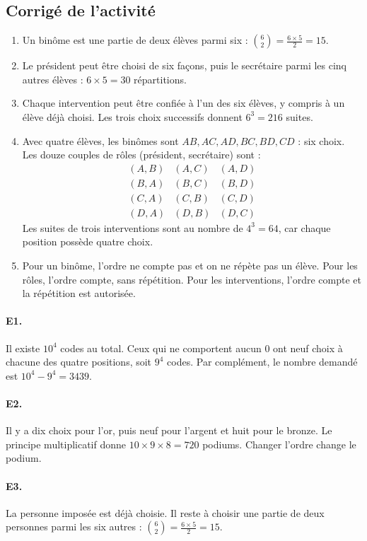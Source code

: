\subsection{Corrigé de l'activité}\begin{enumerate}
\item Un binôme est une partie de deux élèves parmi six : $\binom{6}{2}=\frac{6\times5}{2}=15$.
\item Le président peut être choisi de six façons, puis le secrétaire parmi les cinq autres élèves : $6\times5=30$ répartitions.
\item Chaque intervention peut être confiée à l'un des six élèves, y compris à un élève déjà choisi. Les trois choix successifs donnent $6^3=216$ suites.
\item Avec quatre élèves, les binômes sont $AB,AC,AD,BC,BD,CD$ : six choix. Les douze couples de rôles (président, secrétaire) sont :\[\begin{array}{lll}(A,B)&(A,C)&(A,D)\\(B,A)&(B,C)&(B,D)\\(C,A)&(C,B)&(C,D)\\(D,A)&(D,B)&(D,C)\end{array}\] Les suites de trois interventions sont au nombre de $4^3=64$, car chaque position possède quatre choix.
\item Pour un binôme, l'ordre ne compte pas et on ne répète pas un élève. Pour les rôles, l'ordre compte, sans répétition. Pour les interventions, l'ordre compte et la répétition est autorisée.
\end{enumerate}

\paragraph{E1.}Il existe $10^4$ codes au total. Ceux qui ne comportent aucun $0$ ont neuf choix à chacune des quatre positions, soit $9^4$ codes. Par complément, le nombre demandé est $10^4-9^4=3439$.

\paragraph{E2.}Il y a dix choix pour l'or, puis neuf pour l'argent et huit pour le bronze. Le principe multiplicatif donne $10\times9\times8=720$ podiums. Changer l'ordre change le podium.

\paragraph{E3.}La personne imposée est déjà choisie. Il reste à choisir une partie de deux personnes parmi les six autres : $\binom{6}{2}=\frac{6\times5}{2}=15$.


